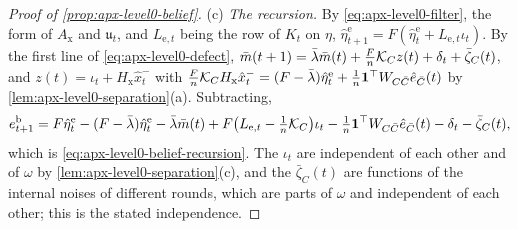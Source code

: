 \begin{proof}[Proof of \cref{prop:apx-level0-belief}]
(c) \emph{The recursion.} By \eqref{eq:apx-level0-filter}, the form of $A_{\mathrm x}$ and $\mathfrak u_t$, and $L_{\mathrm e,t}$ being the row of $K_t$ on $\eta$, $\hat\eta^{\mathrm e}_{t+1}=F(\hat\eta^{\mathrm e}_t+L_{\mathrm e,t}\iota_t)$. By the first line of \eqref{eq:apx-level0-defect}, $\bar m(t+1)=\bar\lambda\bar m(t)+\frac Fn\mathcal{K}_Cz(t)+\delta_t+\bar\zeta_C(t)$, and $z(t)=\iota_t+H_{\mathrm x}\hat x^-_t$ with $\frac Fn\mathcal{K}_CH_{\mathrm x}\hat x^-_t=(F-\bar\lambda)\hat\eta^{\mathrm e}_t+\frac1n\mathbf{1}^\top W_{C\bar C}\hat e_{\bar C}(t)$ by \cref{lem:apx-level0-separation}(a). Subtracting,
\begin{equation*}
e^{\mathrm b}_{t+1}=F\hat\eta^{\mathrm e}_t-(F-\bar\lambda)\hat\eta^{\mathrm e}_t-\bar\lambda\bar m(t)+F\bigl(L_{\mathrm e,t}-\tfrac1n\mathcal{K}_C\bigr)\iota_t-\tfrac1n\mathbf{1}^\top W_{C\bar C}\hat e_{\bar C}(t)-\delta_t-\bar\zeta_C(t),
\end{equation*}
which is \eqref{eq:apx-level0-belief-recursion}. The $\iota_t$ are independent of each other and of $\omega$ by \cref{lem:apx-level0-separation}(c), and the $\bar\zeta_C(t)$ are functions of the internal noises of different rounds, which are parts of $\omega$ and independent of each other; this is the stated independence.


\end{proof}
